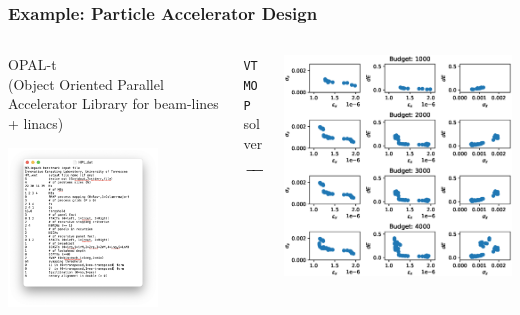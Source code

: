 \documentclass[aspectratio=169]{beamer}
\begin{document}
\begin{frame}\frametitle{Example: Particle Accelerator Design}
\begin{columns}
\begin{column}{.3\textwidth}
\begin{center}
{\large OPAL-t}\\
(Object Oriented Parallel Accelerator Library for beam-lines + linacs)
\end{center}
\begin{center}
\includegraphics[width=0.7\textwidth]{../img/probs/hpl_dat.png}\\
\end{center}
\end{column}
\begin{column}{.2\textwidth}
\begin{center}
{\tt VTMOP} solver
$$\xrightarrow{\hspace*{2cm}}$$
\end{center}
\end{column}
\begin{column}{.4\textwidth}
\includegraphics[width=\textwidth]{opal_res_4k.eps}

\end{column}
\end{columns}
\end{frame}
\end{document}
